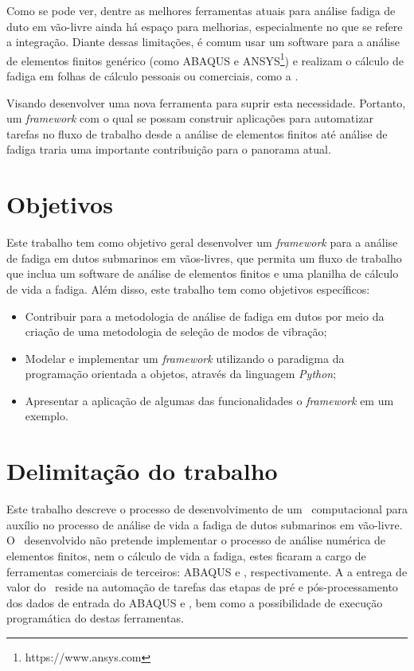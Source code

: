 Como se pode ver, dentre as melhores ferramentas atuais para análise fadiga de duto em vão-livre ainda há espaço para melhorias, especialmente no que se refere a integração. Diante dessas limitações, é comum usar um software para a análise de elementos finitos genérico (como ABAQUS e ANSYS\footnote{https://www.ansys.com}) e realizam o cálculo de fadiga em folhas de cálculo pessoais ou comerciais, como a \fatfree.

Visando desenvolver uma nova ferramenta para suprir esta necessidade. Portanto, um \textit{framework} com o qual se possam construir aplicações para automatizar tarefas no fluxo de trabalho desde a análise de elementos finitos até análise de fadiga traria uma importante contribuição para o panorama atual.


\section{Objetivos}


Este trabalho tem como objetivo geral desenvolver um \textit{framework} para a análise de fadiga em dutos submarinos em vãos-livres, que permita um fluxo de trabalho que inclua um software de análise de elementos finitos e uma planilha de cálculo de vida a fadiga.
Além disso, este trabalho tem como objetivos específicos:

\begin{itemize}
    \item Contribuir para a metodologia de análise de fadiga em dutos por meio da criação de uma metodologia de seleção de modos de vibração;
    \item Modelar e implementar um \textit{framework} utilizando o paradigma da programação orientada a objetos, através da linguagem \textit{Python};
    \item Apresentar a aplicação de algumas das funcionalidades o \textit{framework} em um exemplo.
\end{itemize}


\section{Delimitação do trabalho}


Este trabalho descreve o processo de desenvolvimento de um \frame\ computacional para auxílio no processo de análise de vida a fadiga de dutos submarinos em vão-livre. O \frame\ desenvolvido não pretende implementar o processo de análise numérica de elementos finitos, nem o cálculo de vida a fadiga, estes ficaram a cargo de ferramentas comerciais de terceiros: ABAQUS e \fatfree, respectivamente. A a entrega de valor do \frame\ reside na automação de tarefas das etapas de pré e pós-processamento dos dados de entrada do ABAQUS e \fatfree, bem como a possibilidade de execução programática do destas ferramentas.



